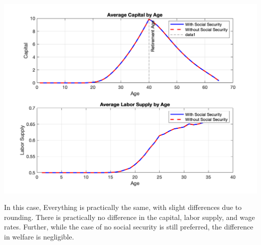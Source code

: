 \documentclass[10pt,a4paper]{article}
\begin{document}
\includegraphics[width=\textwidth]{wealth_labor_profiles99.png}


In this case, Everything is practically the same, with slight differences due to rounding.
There is practically no difference in the capital, labor supply, and wage rates. Further, while
the case of no social security is still preferred, the difference in welfare is negligible.
\end{document}
